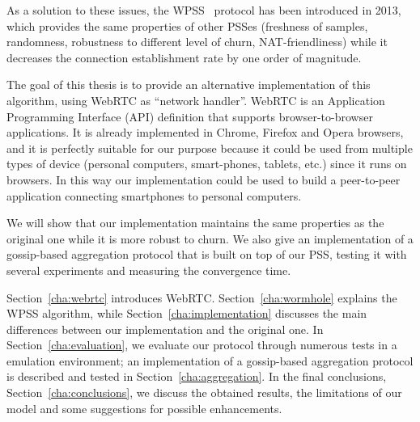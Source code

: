 As a solution to these issues, the \ac{WPSS}~\cite{wormhole} protocol has been introduced in 2013, which provides the same properties of other PSSes (freshness of samples, randomness, robustness to different level of churn, NAT-friendliness) while it decreases the connection establishment rate by one order of magnitude. 

The goal of this thesis is to provide an alternative implementation of this algorithm, using \mbox{WebRTC} as ``network handler''. WebRTC is an Application Programming Interface (API) definition that supports browser-to-browser applications. It is already implemented in Chrome, Firefox and Opera browsers, and it is perfectly suitable for our purpose because it could be used from multiple types of device (personal computers, smart-phones, tablets, etc.) since it runs on browsers. In this way our implementation could be used to build a peer-to-peer application connecting smartphones to  personal computers.

We will show that our implementation maintains the same properties as the original one while it is more robust to churn. We also give an implementation of a gossip-based aggregation protocol that is built on top of our PSS, testing it with several experiments and measuring the convergence time.

Section~\ref{cha:webrtc} introduces WebRTC. Section~\ref{cha:wormhole} explains the \ac{WPSS} algorithm, while Section~\ref{cha:implementation} discusses the main differences between our implementation and the original one. In Section~\ref{cha:evaluation}, we evaluate our protocol through numerous tests in a emulation environment; an implementation of a gossip-based aggregation protocol is described and tested in Section~\ref{cha:aggregation}. In the final conclusions, Section~\ref{cha:conclusions}, we discuss the obtained results, the limitations of our model and some suggestions for possible enhancements.
